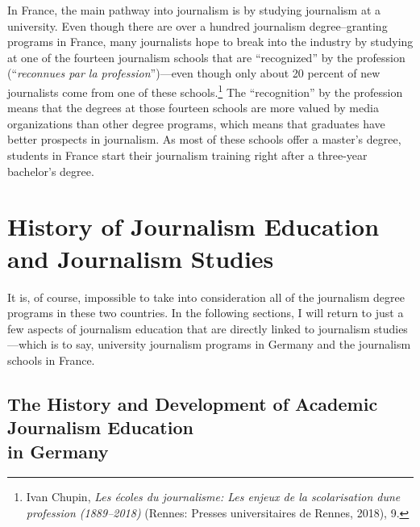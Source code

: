 \documentclass{tufte-handout}
\begin{document}
In France, the main pathway into journalism is by studying journalism at
a university. Even though there are over a hundred journalism
degree--granting programs in France, many journalists hope to break into
the industry by studying at one of the fourteen journalism schools that
are ``recognized'' by the profession (``\emph{reconnues par la
profession}'')---even though only about 20 percent of new journalists
come from one of these schools.\footnote{Ivan Chupin, \emph{Les écoles
  du journalisme: Les enjeux de la scolarisation d\textquotesingle une
  profession (1889--2018)} (Rennes: Presses universitaires de Rennes,
  2018), 9.} The ``recognition'' by the profession means that the
degrees at those fourteen schools are more valued by media organizations
than other degree programs, which means that graduates have better
prospects in journalism. As most of these schools offer a master's
degree, students in France start their journalism training right after a
three-year bachelor's degree.

\hypertarget{history-of-journalism-education-and-journalism-studies}{%
\section{History of Journalism Education and Journalism
Studies}\label{history-of-journalism-education-and-journalism-studies}}

It is, of course, impossible to take into consideration all of the
journalism degree programs in these two countries. In the following
sections, I will return to just a few aspects of journalism education
that are directly linked to journalism studies---which is to say,
university journalism programs in Germany and the journalism schools in
France.

\hypertarget{the-history-and-development-of-academic-journalism-education-in-germany}{%
\subsection{The History and Development of
Academic Journalism Education\\\noindent in
Germany}\label{the-history-and-development-of-academic-journalism-education-in-germany}}
\end{document}
